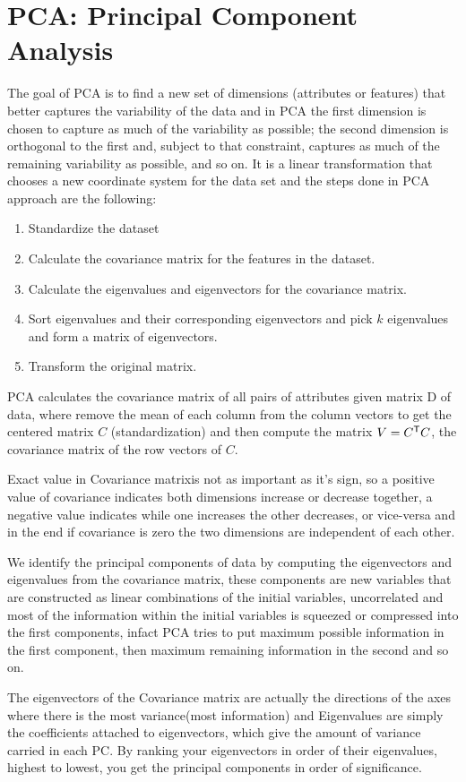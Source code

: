 \section{PCA: Principal Component Analysis}
The goal of PCA is to find a new set of dimensions (attributes or features) that better captures the variability of the data and in PCA
the first dimension is chosen to capture as much of the variability as possible; the second dimension is orthogonal to the first
and, subject to that constraint, captures as much of the remaining variability as possible, and so on.\newline
It is a linear transformation that chooses a new coordinate system for the data set and the steps done in PCA approach are the following:
\begin{enumerate}
    \item Standardize the dataset 
    \item Calculate the covariance matrix for the features in the dataset.
    \item Calculate the eigenvalues and eigenvectors for the covariance matrix.
    \item Sort eigenvalues and their corresponding eigenvectors and pick $k$ eigenvalues and form a matrix of eigenvectors. 
    \item Transform the original matrix.
\end{enumerate}
PCA calculates the covariance matrix of all pairs of attributes given matrix D of data, where remove the mean of each column from the column vectors
to get the centered matrix $C$ (standardization) and then compute the matrix $V = C ^ \mathsf{T} C$, the covariance matrix of the row vectors of $C$.

Exact value in Covariance matrixis not as important as it’s sign, so a positive value of covariance indicates both dimensions increase or decrease together,
a negative value indicates while one increases the other decreases, or vice-versa and in the end if covariance is zero 
the two dimensions are independent of each other.

We identify the principal components of data by computing the eigenvectors and eigenvalues from the covariance matrix, these components are 
new variables that are constructed as linear combinations of the initial variables, uncorrelated and most of the information 
within the initial variables is squeezed or compressed into the first components, infact PCA tries to put maximum possible information in the first
component, then maximum remaining information in the second and so on.

The eigenvectors of the Covariance matrix are actually the directions of the axes where there is the most variance(most information) and 
Eigenvalues are simply the coefficients attached to eigenvectors, which give the amount of variance carried in each PC.\newline
By ranking your eigenvectors in order of their eigenvalues, highest to lowest, you get the principal components in order of significance.
